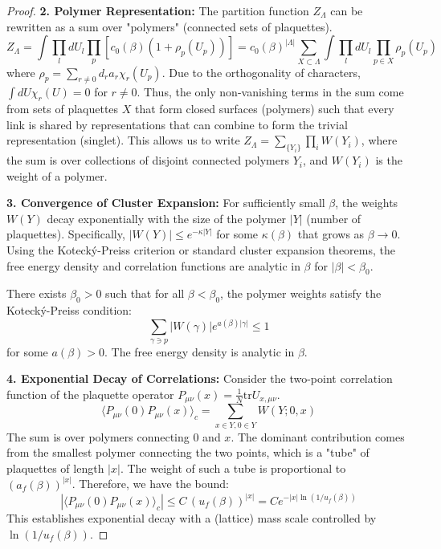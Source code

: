 \begin{proof}
\textbf{2. Polymer Representation:}
The partition function $Z_\Lambda$ can be rewritten as a sum over "polymers" (connected sets of plaquettes).
\begin{equation}
Z_\Lambda = \int \prod_l dU_l \prod_p \left[ c_0(\beta) \left( 1 + \rho_p(U_p) \right) \right] = c_0(\beta)^{|\Lambda|} \sum_{X \subset \Lambda} \int \prod_l dU_l \prod_{p \in X} \rho_p(U_p)
\label{eq:dbg-sc-polymer-partition}
\end{equation}
where $\rho_p = \sum_{r \neq 0} d_r a_r \chi_r(U_p)$. Due to the orthogonality of characters, $\int dU \chi_r(U) = 0$ for $r \neq 0$. Thus, the only non-vanishing terms in the sum come from sets of plaquettes $X$ that form closed surfaces (polymers) such that every link is shared by representations that can combine to form the trivial representation (singlet).
This allows us to write $Z_\Lambda = \sum_{\{Y_i\}} \prod_i W(Y_i)$, where the sum is over collections of disjoint connected polymers $Y_i$, and $W(Y_i)$ is the weight of a polymer.

\textbf{3. Convergence of Cluster Expansion:}
For sufficiently small $\beta$, the weights $W(Y)$ decay exponentially with the size of the polymer $|Y|$ (number of plaquettes). Specifically, $|W(Y)| \le e^{-\kappa |Y|}$ for some $\kappa(\beta)$ that grows as $\beta \to 0$.
Using the Kotecký-Preiss criterion or standard cluster expansion theorems, the free energy density and correlation functions are analytic in $\beta$ for $|\beta| < \beta_0$.

\begin{theorem}
\label{thm:cluster_convergence}
There exists $\beta_0 > 0$ such that for all $\beta < \beta_0$, the polymer weights satisfy the Kotecký-Preiss condition:
\begin{equation}
\sum_{\gamma \ni p} |W(\gamma)| e^{a(\beta)|\gamma|} \leq 1
\end{equation}
for some $a(\beta) > 0$. The free energy density is analytic in $\beta$.
\end{theorem}

\textbf{4. Exponential Decay of Correlations:}
Consider the two-point correlation function of the plaquette operator $P_{\mu\nu}(x) = \frac{1}{N} \text{tr} U_{x,\mu\nu}$.
\begin{equation}
\langle P_{\mu\nu}(0) P_{\mu\nu}(x) \rangle_c = \sum_{x \in Y, 0 \in Y} W(Y; 0, x)
\label{eq:dbg-sc-corr-polymer-sum}
\end{equation}
The sum is over polymers connecting $0$ and $x$. The dominant contribution comes from the smallest polymer connecting the two points, which is a "tube" of plaquettes of length $|x|$. The weight of such a tube is proportional to $(a_f(\beta))^{|x|}$.
Therefore, we have the bound:
\begin{equation}
|\langle P_{\mu\nu}(0) P_{\mu\nu}(x) \rangle_c| \le C \, (u_f(\beta))^{|x|} = C e^{-|x| \ln(1/u_f(\beta))}
\label{eq:dbg-sc-corr-decay-uf}
\end{equation}
This establishes exponential decay with a (lattice) mass scale controlled by $\ln(1/u_f(\beta))$.


\end{proof}
